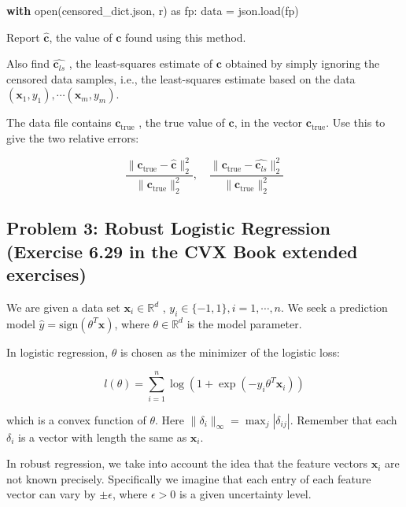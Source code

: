 \documentclass[
  letterpaper,
  DIV=11,
  numbers=noendperiod]{scrartcl}
\newenvironment{Shaded}{\begin{snugshade}}{\end{snugshade}}
\newcommand{\BuiltInTok}[1]{\textcolor[rgb]{0.00,0.23,0.31}{#1}}
\newcommand{\ControlFlowTok}[1]{\textcolor[rgb]{0.00,0.23,0.31}{\textbf{#1}}}
\newcommand{\ImportTok}[1]{\textcolor[rgb]{0.00,0.46,0.62}{#1}}
\newcommand{\NormalTok}[1]{\textcolor[rgb]{0.00,0.23,0.31}{#1}}
\newcommand{\OperatorTok}[1]{\textcolor[rgb]{0.37,0.37,0.37}{#1}}
\newcommand{\StringTok}[1]{\textcolor[rgb]{0.13,0.47,0.30}{#1}}
\begin{document}
\begin{Shaded}
\begin{Highlighting}[]
\ControlFlowTok{with} \BuiltInTok{open}\NormalTok{(}\StringTok{\textquotesingle{}censored\_dict.json\textquotesingle{}}\NormalTok{, }\StringTok{\textquotesingle{}r\textquotesingle{}}\NormalTok{) }\ImportTok{as}\NormalTok{ fp:}
\NormalTok{    data }\OperatorTok{=}\NormalTok{ json.load(fp)}
\end{Highlighting}
\end{Shaded}

Report \(\hat{\mathbf{c}}\), the value of \(\mathbf{c}\) found using
this method.

Also find \(\hat{\mathbf{c}_{ls}}\) , the least-squares estimate of
\(\mathbf{c}\) obtained by simply ignoring the censored data samples,
i.e., the least-squares estimate based on the data
\((\mathbf{x}_1 , y_1 ), \cdots (\mathbf{x}_m , y_m )\).

The data file contains \(\mathbf{c}_{\mathrm{true}}\) , the true value
of \(\mathbf{c}\), in the vector \(\mathbf{c}_{\mathrm{true}}\). Use
this to give the two relative errors:

\[
\frac{\|\mathbf{c}_{\mathrm{true}}- \hat{\mathbf{c}}\|_2^2}{\|\mathbf{c}_{\mathrm{true}}\|_2^2},\quad
\frac{\|\mathbf{c}_{\mathrm{true}}- \hat{\mathbf{c}_{ls}}\|_2^2}{\|\mathbf{c}_{\mathrm{true}}\|_2^2}
\]

\subsection{Problem 3: Robust Logistic Regression (Exercise 6.29 in the
CVX Book extended
exercises)}\label{problem-3-robust-logistic-regression-exercise-6.29-in-the-cvx-book-extended-exercises}

We are given a data set \(\mathbf{x}_i \in \mathbb{R}^d\) ,
\(y_i \in \{−1, 1\}, i = 1, \cdots , n\). We seek a prediction model
\(\hat{y} = \mathrm{sign}(\theta^T \mathbf{x})\), where
\(\theta \in \mathbb{R}^d\) is the model parameter.

In logistic regression, \(\theta\) is chosen as the minimizer of the
logistic loss:

\[
l(\theta) = \sum_{i=1}^n \log\left(1 + \exp\left(-y_i\theta^T\mathbf{x}_i\right)\right)
\]

which is a convex function of \(\theta\). Here
\(\|\delta_i\|_{\infty} = \max_j |\delta_{ij}|\). Remember that each
\(\delta_i\) is a vector with length the same as \(\mathbf{x}_i\).

In robust regression, we take into account the idea that the feature
vectors \(\mathbf{x}_i\) are not known precisely. Specifically we
imagine that each entry of each feature vector can vary by
\(\pm\epsilon\), where \(\epsilon > 0\) is a given uncertainty level.
\end{document}
